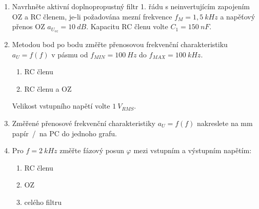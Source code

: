 \begin{minipage}[H][11.48cm][c]{0.8\textwidth}
  \begin{enumerate}
    \item
      Navrhněte aktivní doplnopropustný filtr 1. řádu s neinvertujícím zapojením OZ a RC členem, je-li požadována mezní frekvence $f_M=1,5~kHz$ a napěťový přenos OZ $a_{U_{oz}}=10~dB$. Kapacitu RC členu volte $C_1=150~nF$.
    \item
      Metodou bod po bodu změřte přenosovou frekvenční charakteristiku $a_U=f(f)$ v pásmu od $f_{MIN}=100~Hz$ do $f_{MAX}=100~kHz$.
      \begin{enumerate}
        \item
          RC členu
        \item
          RC členu a OZ
      \end{enumerate}
      Velikost vstupního napětí volte $1~V_{RMS}$.
    \item
			Změřené přenosové frekvenční charakteristiky $a_U=f(f)$ nakreslete na mm papír~/~na PC do jednoho grafu.   			
    \item
      Pro $f=2~kHz$ změřte fázový posun $\varphi$ mezi vstupním a výstupním napětím:
      \begin{enumerate}
        \item
          RC členu
        \item
          OZ
        \item
          celého filtru
      \end{enumerate}      
	\end{enumerate}
\end{minipage}


